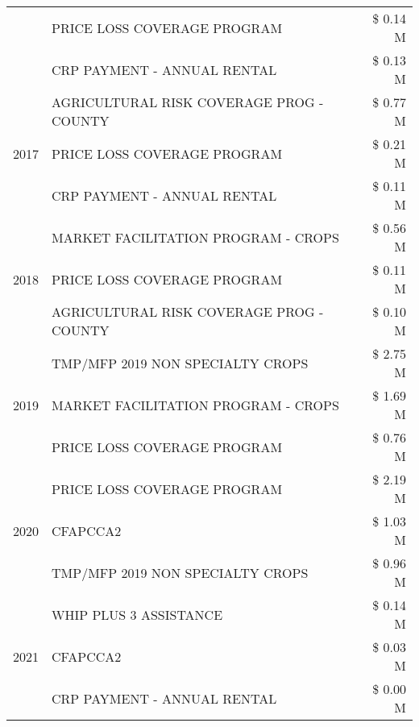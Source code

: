 \begin{tabular}{llr}
 & PRICE LOSS COVERAGE PROGRAM & \$ 0.14 M \\
 & CRP PAYMENT - ANNUAL RENTAL & \$ 0.13 M \\
\cline{1-3}
\multirow[t]{3}{*}{2017} & AGRICULTURAL RISK COVERAGE PROG - COUNTY & \$ 0.77 M \\
 & PRICE LOSS COVERAGE PROGRAM & \$ 0.21 M \\
 & CRP PAYMENT - ANNUAL RENTAL & \$ 0.11 M \\
\cline{1-3}
\multirow[t]{3}{*}{2018} & MARKET FACILITATION PROGRAM - CROPS & \$ 0.56 M \\
 & PRICE LOSS COVERAGE PROGRAM & \$ 0.11 M \\
 & AGRICULTURAL RISK COVERAGE PROG - COUNTY & \$ 0.10 M \\
\cline{1-3}
\multirow[t]{3}{*}{2019} & TMP/MFP 2019 NON SPECIALTY CROPS & \$ 2.75 M \\
 & MARKET FACILITATION PROGRAM - CROPS & \$ 1.69 M \\
 & PRICE LOSS COVERAGE PROGRAM & \$ 0.76 M \\
\cline{1-3}
\multirow[t]{3}{*}{2020} & PRICE LOSS COVERAGE PROGRAM & \$ 2.19 M \\
 & CFAPCCA2 & \$ 1.03 M \\
 & TMP/MFP 2019 NON SPECIALTY CROPS & \$ 0.96 M \\
\cline{1-3}
\multirow[t]{3}{*}{2021} & WHIP PLUS 3 ASSISTANCE & \$ 0.14 M \\
 & CFAPCCA2 & \$ 0.03 M \\
 & CRP PAYMENT - ANNUAL RENTAL & \$ 0.00 M \\
\cline{1-3}
\bottomrule
\end{tabular}
